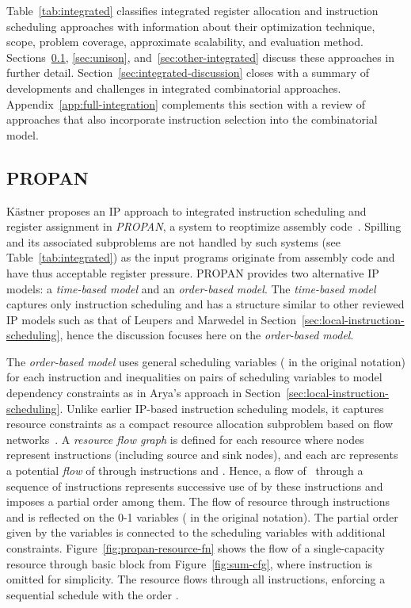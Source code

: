 \documentclass[acmsmall,authorversion,nonacm]{acmart}
\newcommand{\var}[2]{}
\begin{document}
Table~\ref{tab:integrated} classifies integrated register allocation
and instruction scheduling approaches with information about their
optimization technique, scope, problem coverage, approximate
scalability, and evaluation method.
Sections~\ref{sec:propan}, \ref{sec:unison},
and~\ref{sec:other-integrated} discuss these approaches in further
detail.
Section~\ref{sec:integrated-discussion} closes with a summary of
developments and challenges in integrated combinatorial approaches.
Appendix~\ref{app:full-integration} complements this section with a
review of approaches that also incorporate instruction selection into
the combinatorial model.

\subsection{PROPAN}\label{sec:propan}

K\"{a}stner proposes an IP approach to integrated instruction
scheduling and register assignment in \emph{PROPAN}, a system to
reoptimize assembly code~\cite{Kastner2001}.
Spilling and its associated subproblems are not handled by such
systems (see Table~\ref{tab:integrated}) as the input programs
originate from assembly code and have thus acceptable register
pressure.
PROPAN provides two alternative IP models: a \emph{time-based model}
and an \emph{order-based model}.
The \emph{time-based model} captures only instruction scheduling and
has a structure similar to other reviewed IP models such as that of
Leupers and Marwedel in
Section~\ref{sec:local-instruction-scheduling}, hence the discussion
focuses here on the \emph{order-based model}.

The \emph{order-based model} uses general scheduling variables
\var{s}{i} ( in the original notation) for each instruction 
and inequalities on pairs of scheduling variables to model dependency
constraints as in Arya's approach in
Section~\ref{sec:local-instruction-scheduling}.
Unlike earlier IP-based instruction scheduling models, it captures
resource constraints as a compact resource allocation subproblem based
on flow networks~\cite{Zhang1996,Kastner1999,Kastner2000b}.
A \emph{resource flow graph} is defined for each resource  where
nodes represent instructions (including source and sink nodes), and
each arc  represents a potential \emph{flow} of 
through instructions  and .
Hence, a flow of~ through a sequence of instructions represents
successive use of  by these instructions and imposes a partial
order among them.
The flow of resource  through instructions  and  is reflected
on the 0-1 variables \var{u}{l,i,j} ( in the original
notation).
The partial order given by the \var{u}{l,i,j} variables is connected
to the scheduling variables with additional constraints.
Figure~\ref{fig:propan-resource-fn} shows the flow of a
single-capacity resource through basic block  from
Figure~\ref{fig:sum-cfg}, where instruction  is omitted
for simplicity.
The resource flows through all instructions, enforcing a sequential
schedule with the order .
\end{document}
